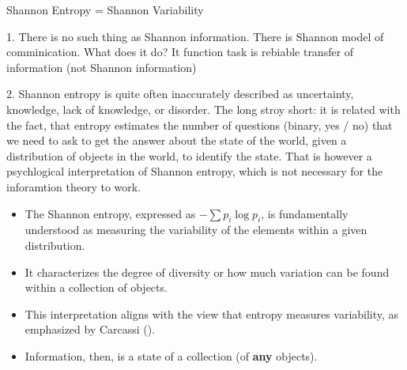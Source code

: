 \documentclass[10pt, aspectratio=169]{beamer}
\begin{document}
\begin{frame}[label=shannon_entropy]{Shannon Entropy =  Shannon Variability}

    1. There is no such thing as Shannon information. There is Shannon model of comminication.
    What does it do? It function task is rebiable transfer of information (not Shannon information)

    2.  Shannon entropy is quite often inaccurately described as uncertainty, knowledge, lack of knowledge, or disorder. The long stroy short: it is related with the fact, that entropy estimates the number of questions (binary, yes / no) that we need to ask to get the answer about the state of the world, given a distribution of objects in the world, to identify the state. That is however a psychlogical interpretation of Shannon entropy, which is not necessary for the inforamtion theory to work.

    \begin{itemize}
        \item The Shannon entropy, expressed as $- \sum p_i \log p_i$, is fundamentally understood as measuring the variability of the elements within a given distribution. 
        \item It characterizes the degree of diversity or how much variation can be found within a collection of objects.
        \item This interpretation aligns with the view that entropy measures variability, as emphasized by Carcassi (\cite{carcassi_variability_2021}).
        \item Information, then, is a state of a collection (of \textbf{any} objects).
    \end{itemize}
\end{frame}
\end{document}
